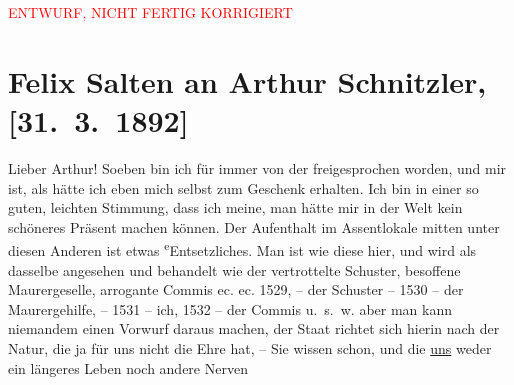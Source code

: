 
\begin{center}
            \textcolor{red}{ENTWURF, NICHT FERTIG KORRIGIERT}
                      \end{center}
            
         
         \renewcommand{\erwaehntePersonen}{Personen:  ?? [Partnerin von Felix Salten, Ende März 1892], Felix Salten}
         \renewcommand{\erwaehnteOrte}{Orte: Café Kremser, Kettenbrücke, Wien}
         \renewcommand{\erwaehnteWerke}{Werke: Tagebuch}
               \section[Felix Salten an Arthur Schnitzler, {[}31. 3. 1892{]}]{ Felix Salten an Arthur Schnitzler, {[}31. 3. 1892{]}}\nopagebreak{}\rehead{ }\begin{ledgroupsized}[t]{13cm}\normalsize\beginnumbering \toendnotes[C]{\smallbreak\pagebreak[2]} 
\toendnotes[C]{\smallbreak}\pstart
           \noindent{}{\pb}Lieber Arthur! Soeben bin ich für immer von der
                  \label{K_L03108-1v}\label{K_L03108-1h}
               freigesprochen worden, und mir ist, als hätte ich eben mich selbst zum Geschenk
               erhalten. Ich bin in einer so guten, leichten Stimmung, dass ich meine, man hätte mir
               in der Welt kein schöneres Präsent machen können. Der Aufenthalt {\pb}im Assentlokale mitten
               unter diesen Anderen ist etwas \substVorne{}\textsuperscript{e}\substDazwischen{}E\substHinten{}ntsetzliches. Man ist wie diese hier, und wird als
               dasselbe angesehen und behandelt wie der vertrottelte Schuster, besoffene
               Maurergeselle, arrogante Commis ec. ec. 1529, – der Schuster – 1530 – der
               Maurergehilfe, – 1531 – ich, 1532 – der Commis u. s. w. aber man kann niemandem einen
               Vorwurf daraus machen, der Staat richtet {\pb}sich hierin nach der
               Natur, die ja für uns nicht die Ehre hat, – Sie wissen schon, und die \uline{uns} weder ein längeres Leben noch andere Nerven

\end{ledgroupsized}
